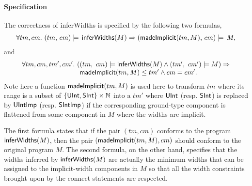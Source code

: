 
\paragraph*{Specification}
The correctness of {\sf inferWidths} is specified by the following two formulas,
%
$$
 \forall tm, cm.\ (tm,\,cm) \models \, {\sf inferWidths}(M) \Rightarrow (\madeimplicit(tm, M),\,cm) \models \,M,
$$
and
$$
\begin{array}{l}
\forall tm, cm, tm', cm'.\ ((tm,\ cm) \models \inferwidths(M) \wedge (tm',\ cm') \models M) \Rightarrow \\
\hspace{3cm} \madeimplicit(tm, M) \le tm' \wedge cm = cm'.
\end{array}
$$
Note here a function ${\sf madeImplicit}(tm, M)$ is used here to transform $tm$ where its range is a subset of $\{{\sf UInt}, {\sf SInt}\} \times \mathbb{N}$ into a $tm'$ where ${\sf UInt}$ (resp. ${\sf SInt}$) is replaced by ${\sf UIntImp}$ (resp. ${\sf SIntImp}$) if the corresponding ground-type component is flattened from some component in $M$ where the widths are implicit. 
%

The first formula states that if the pair $(tm, cm)$ conforms to the program ${\sf inferWidths}(M)$, then the pair $({\sf madeImplicit}(tm, M), cm)$ should conform to the original program $M$.
The second formula, on the other hand, specifies that the widths inferred by ${\sf inferWidths}(M)$ are actually the minimum widths that can be assigned to the implicit-width components in $M$ so that all the width constraints brought upon by the connect statements are respected. 



